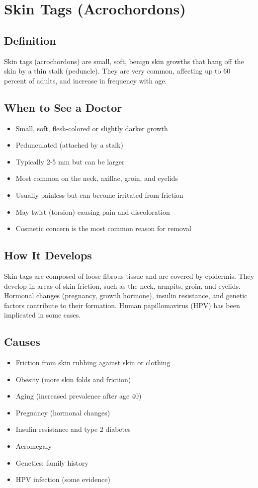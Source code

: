 \chapter{Skin Tags (Acrochordons)}

\section*{Definition}
Skin tags (acrochordons) are small, soft, benign skin growths that hang off the skin by a thin stalk (peduncle). They are very common, affecting up to 60 percent of adults, and increase in frequency with age.

\section*{When to See a Doctor}
\begin{itemize}
\item Small, soft, flesh-colored or slightly darker growth
\item Pedunculated (attached by a stalk)
\item Typically 2-5 mm but can be larger
\item Most common on the neck, axillae, groin, and eyelids
\item Usually painless but can become irritated from friction
\item May twist (torsion) causing pain and discoloration
\item Cosmetic concern is the most common reason for removal
\end{itemize}

\section*{How It Develops}
Skin tags are composed of loose fibrous tissue and are covered by epidermis. They develop in areas of skin friction, such as the neck, armpits, groin, and eyelids. Hormonal changes (pregnancy, growth hormone), insulin resistance, and genetic factors contribute to their formation. Human papillomavirus (HPV) has been implicated in some cases.

\section*{Causes}
\begin{itemize}
\item Friction from skin rubbing against skin or clothing
\item Obesity (more skin folds and friction)
\item Aging (increased prevalence after age 40)
\item Pregnancy (hormonal changes)
\item Insulin resistance and type 2 diabetes
\item Acromegaly
\item Genetics: family history
\item HPV infection (some evidence)
\end{itemize}

